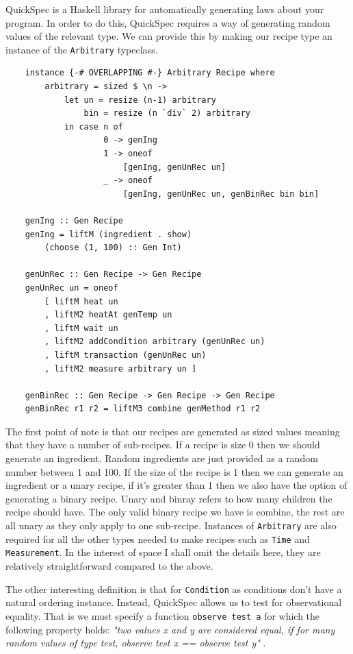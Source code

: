 \documentclass[11pt]{article}
\begin{document}
QuickSpec \cite{quickspec, quickspec2} is a Haskell library for automatically generating
laws about your program. In order to do this, QuickSpec requires a way of generating
random values of the relevant type. We can provide this by making our recipe type
an instance of the \texttt{Arbitrary} typeclass.

\begin{lstlisting}
    instance {-# OVERLAPPING #-} Arbitrary Recipe where
        arbitrary = sized $ \n ->
            let un = resize (n-1) arbitrary
                bin = resize (n `div` 2) arbitrary
            in case n of
                    0 -> genIng
                    1 -> oneof
                        [genIng, genUnRec un]
                    _ -> oneof
                        [genIng, genUnRec un, genBinRec bin bin]

    genIng :: Gen Recipe
    genIng = liftM (ingredient . show)
        (choose (1, 100) :: Gen Int)

    genUnRec :: Gen Recipe -> Gen Recipe
    genUnRec un = oneof
        [ liftM heat un
        , liftM2 heatAt genTemp un
        , liftM wait un
        , liftM2 addCondition arbitrary (genUnRec un)
        , liftM transaction (genUnRec un)
        , liftM2 measure arbitrary un ]

    genBinRec :: Gen Recipe -> Gen Recipe -> Gen Recipe
    genBinRec r1 r2 = liftM3 combine genMethod r1 r2
\end{lstlisting}

The first point of note is that our recipes are generated as sized values meaning
that they have a number of sub-recipes. If a recipe is size 0 then we should generate
an ingredient. Random ingredients are just provided as a random number between 1 and 100.
If the size of the recipe is 1 then we can generate an ingredient or a unary recipe,
if it's greater than 1 then we also have the option of generating a binary recipe.
Unary and binray refers to how many children the recipe should have. The only
valid binary recipe we have is combine, the rest are all unary as they only apply to
one sub-recipe. Instances of \texttt{Arbitrary} are also required for all the other types
needed to make recipes such as \texttt{Time} and \texttt{Measurement}. In the interest
of space I shall omit the details here, they are relatively straightforward compared to
the above.

\medbreak

The other interesting definition is that for \texttt{Condition} as conditions don't
have a natural ordering instance. Instead, QuickSpec allows us to test for observational
equality. That is we must specify a function \texttt{observe test a} for which the
following property holds: \textit{"two values x and y are considered equal,
if for many random values of type test, observe test x == observe test y"} \cite{quickspec-docs}.
\end{document}
